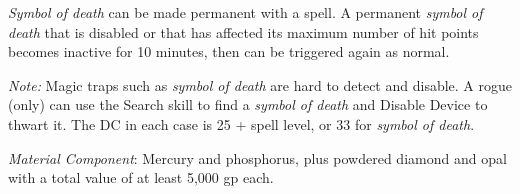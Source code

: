 {	\emph{Symbol of death} can be made permanent with a  spell. A permanent \emph{symbol of death} that is disabled or that has affected its maximum number of hit points becomes inactive for 10 minutes, then can be triggered again as normal.

	\textit{Note:}
	Magic traps such as \emph{symbol of death} are hard to detect and disable. A rogue (only) can use the Search skill to find a \emph{symbol of death} and Disable Device to thwart it. The DC in each case is 25 + spell level, or 33 for \emph{symbol of death}.

	\textit{Material Component}:
	Mercury and phosphorus, plus powdered diamond and opal with a total value of at least 5,000 gp each.

}
